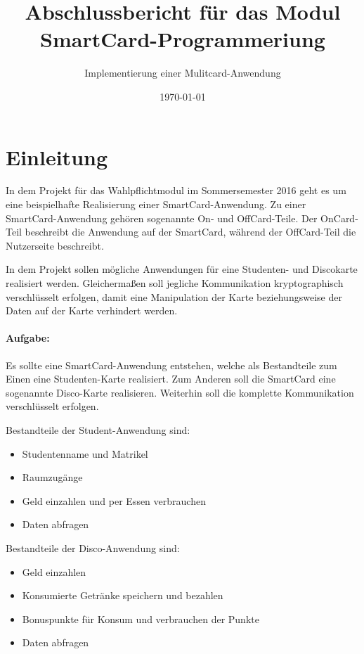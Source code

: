 
\title{Abschlussbericht für das Modul SmartCard-Programmeriung}
\subtitle{Implementierung einer Mulitcard-Anwendung\vspace{1cm}}

\author{}
\date{\today}

\maketitle

\tableofcontents
\pagebreak

\section{Einleitung}
In dem Projekt  für das Wahlpflichtmodul  im Sommersemester 2016 geht es um eine beispielhafte Realisierung einer SmartCard-Anwendung.
Zu einer SmartCard-Anwendung gehören sogenannte On- und OffCard-Teile.
Der OnCard-Teil beschreibt die Anwendung auf der SmartCard, während der OffCard-Teil die Nutzerseite beschreibt.

In dem Projekt  sollen mögliche Anwendungen für eine Studenten- und Discokarte realisiert werden.
Gleichermaßen soll jegliche Kommunikation kryptographisch verschlüsselt erfolgen, damit eine Manipulation der Karte beziehungsweise der Daten auf der Karte verhindert werden.

\paragraph{Aufgabe:}
Es sollte eine SmartCard-Anwendung entstehen, welche als Bestandteile zum Einen eine Studenten-Karte realisiert.
Zum Anderen soll die SmartCard eine sogenannte Disco-Karte realisieren.
Weiterhin soll die komplette Kommunikation verschlüsselt erfolgen.

Bestandteile der Student-Anwendung sind:
\begin{itemize}
	\item Studentenname und Matrikel
	\item Raumzugänge
	\item Geld einzahlen und per Essen verbrauchen
	\item Daten abfragen
\end{itemize}

Bestandteile der Disco-Anwendung sind:
\begin{itemize}
	\item Geld einzahlen
	\item Konsumierte Getränke speichern und bezahlen
	\item Bonuspunkte für Konsum und verbrauchen der Punkte
	\item Daten abfragen
\end{itemize}

